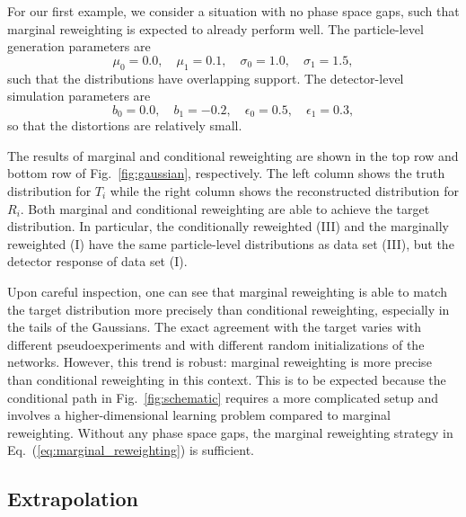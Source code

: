 \documentclass[aps,prx,reprint,preprintnumbers,superscriptaddress,nofootinbib,longbibliography,floatfix]{revtex4-2}
\DeclareRobustCommand{\Fig}[1]{Fig.~\ref{fig:#1}}
\DeclareRobustCommand{\Eq}[1]{Eq.~(\ref{eq:#1})}
\begin{document}
For our first example, we consider a situation with no phase space gaps, such that marginal reweighting is expected to already perform well.
%
The particle-level generation parameters are
%
\begin{equation}
    \mu_0=0.0, \quad \mu_1=0.1, \quad \sigma_0=1.0, \quad \sigma_1=1.5,
\end{equation}
%
such that the distributions have overlapping support.
%
The detector-level simulation parameters are
%
\begin{equation}
    b_0=0.0, \quad b_1=-0.2, \quad \epsilon_0=0.5, \quad \epsilon_1=0.3,
\end{equation}
%
so that the distortions are relatively small.


The results of marginal and conditional reweighting are shown in the top row and bottom row of \Fig{gaussian}, respectively.
%
The left column shows the truth distribution for $T_i$ while the right column shows the reconstructed distribution for $R_i$.
%
Both marginal and conditional reweighting are able to achieve the target distribution.
%
In particular, the conditionally reweighted (III) and the marginally reweighted (I) have the same particle-level distributions as data set (III), but the detector response of data set (I).


Upon careful inspection, one can see that marginal reweighting is able to match the target distribution more precisely than conditional reweighting, especially in the tails of the Gaussians.
%
The exact agreement with the target varies with different pseudoexperiments and with different random initializations of the networks. 
%
However, this trend is robust:  marginal reweighting is more precise than conditional reweighting in this context.
%
This is to be expected because the conditional path in \Fig{schematic} requires a more complicated setup and involves a higher-dimensional learning problem compared to marginal reweighting.
%
Without any phase space gaps, the marginal reweighting strategy in \Eq{marginal_reweighting} is sufficient.




\subsection{Extrapolation}
\end{document}
